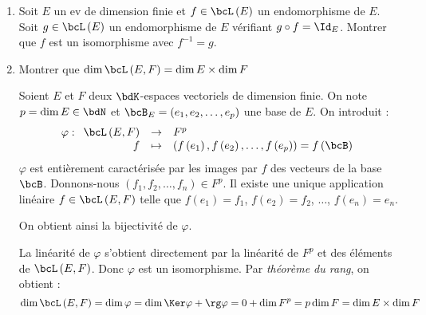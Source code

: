 \documentclass[a4paper,french,bookmarks]{article}
\begin{document}
\begin{enumerate}
    \item Soit $E$ un ev de dimension finie et $f \in \bcL\left(E\right)$ un endomorphisme de $E$. Soit $g \in \bcL\left(E\right)$ un endomorphisme de $E$ vérifiant $g \circ f = \Id_E$. Montrer que $f$ est un isomorphisme avec $f^{-1} = g$.
    
    
    \item Montrer que $\dim \bcL\left(E, F\right) = \dim E \times \dim F$
    
    \noafter
    \nobefore\yesafter
    \begin{nproof}
        Soient $E$ et $F$ deux $\bdK$-espaces vectoriels de dimension finie. On note $p = \dim E \in \bdN$ et $\bcB_E = \left(e_1, e_2, \dots, e_p\right)$ une base de $E$. On introduit :
        \[ \varphi : \begin{array}[t]{rcl}
            \bcL\left(E, F\right) &\to& F^p  \\
            f &\mapsto& \left(f\left(e_1\right), f\left(e_2\right), \dots, f\left(e_p\right)\right) = f\left(\bcB\right)
        \end{array}\]
        $\varphi$ est entièrement caractérisée par les images par $f$ des vecteurs de la base $\bcB$. Donnons-nous $\left(f_1, f_2, \dots, f_n\right) \in F^p$. Il existe une unique application linéaire $f \in \bcL\left(E, F\right)$ telle que $f\left(e_1\right) = f_1$, $f\left(e_2\right) = f_2$, $\dots$, $f\left(e_n\right) = e_n$.
        
        On obtient ainsi la bijectivité de $\varphi$.
        
        La linéarité de $\varphi$ s'obtient directement par la linéarité de $F^p$ et des éléments de $\bcL\left(E, F\right)$. Donc $\varphi$ est un isomorphisme. Par \textit{théorème du rang}, on obtient :
        \[ \dim \bcL\left(E, F\right) = \dim \varphi = \dim \Ker \varphi + \rg \varphi = 0 + \dim F^p = p \dim F = \dim E \times \dim F\]
    \end{nproof}
    \yesbefore
    

\end{enumerate}
\end{document}
